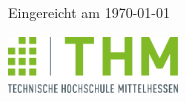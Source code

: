 \begin{titlepage}
\begin{center}
        \vspace{15mm}

        Eingereicht am \today
    \end{center}
    \hfill %
    \includegraphics[height=1.5cm]{functional-pages/figures/thm-thm} %
\end{titlepage}
